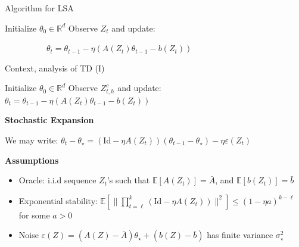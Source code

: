 \documentclass[aspectratio=169,14pt]{beamer}
\begin{document}
\begin{frame}{Algorithm for LSA}
  \begin{algorithmic}
    \State Initialize $\theta_0 \in \mathbb{R}^d$
    \State Observe $Z_{t}$ and update:
    \begin{center}
      ~~~~~~~~~~$\theta_{t} = \theta_{t-1} - \eta( A(Z_{t}) \theta_{t-1} - b(Z_{t}))$
    \end{center}
    \EndFor
  \end{algorithmic}  
  
\end{frame}

\begin{frame}{Context, analysis of TD (I) }
  
  {\tiny
    \begin{algorithmic}
      \State Initialize $\theta_0 \in \mathbb{R}^d$
      \State Observe $Z^c_{t,h}$ and update: $\theta_{t} = \theta_{t-1} - \eta( A(Z_{t}) \theta_{t-1} - b(Z_{t}))$
      \EndFor
    \end{algorithmic}
  }

  \pause
  \vspace{-0.5em}
  
  \textbf{Stochastic Expansion}

  \vspace{-0.5em}

  We may write: $\theta_{t} - \theta_\star = (\text{Id} - \eta A(Z_t))(\theta_{t-1} - \theta_\star) - \eta \varepsilon(Z_t)$  

  \pause
  
  \textbf{Assumptions}

  \vspace{-0.5em}
  
  \begin{itemize}\setlength{\itemindent}{-1em}
    \small
  \item Oracle: i.i.d sequence $Z_{t}$'s such that
    $\mathbb{E} [A(Z_{t})] = \bar{A}$, and
    $\mathbb{E} [b(Z_{t})] = \bar{b}$
    
  \item Exponential stability: $\mathbb{E}[ \| \prod_{t=\ell}^k (\text{Id} - \eta A(Z_t)) \|^2 ] \le (1 - \eta a)^{k-\ell}$ for some $a > 0$

  \item Noise $\varepsilon(Z) = (A(Z) - \bar{A}) \theta_\star + (b(Z) - \bar{b})$ has finite variance $\sigma_\star^2$
  \end{itemize}

  \vspace{1em}


\end{frame}
\end{document}

